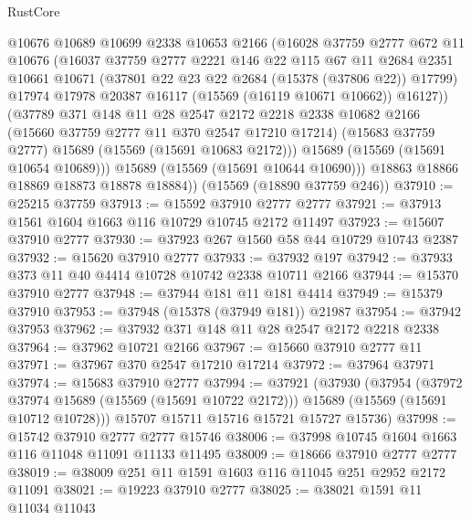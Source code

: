 \begin{lexlean}{RustCore}
\begin{coremodule}
            @10676
            @10689
            @10699
            @2338
            @10653
            @2166
            (@16028
              @37759
              @2777
              @672
              @11
              @10676
              (@16037
                @37759
                @2777
                @2221
                @146
                @22
                @115
                @67
                @11
                @2684
                @2351
                @10661
                @10671
                (@37801 @22 @23 @22 @2684 (@15378 (@37806 @22)) @17799)
                @17974
                @17978
                @20387
                @16117
                (@15569 (@16119 @10671 @10662))
                @16127))
            (@37789
              @371
              @148
              @11
              @28
              @2547
              @2172
              @2218
              @2338
              @10682
              @2166
              (@15660 @37759 @2777 @11 @370 @2547 @17210 @17214)
              (@15683 @37759 @2777)
              @15689
              (@15569 (@15691 @10683 @2172)))
            @15689
            (@15569 (@15691 @10654 @10689)))
          @15689
          (@15569 (@15691 @10644 @10690)))
        @18863
        @18866
        @18869
        @18873
        @18878
        @18884))
    (@15569 (@18890 @37759 @246))
@37910 := @25215 @37759
@37913 := @15592 @37910 @2777 @2777
@37921 := @37913 @1561 @1604 @1663 @116 @10729 @10745 @2172 @11497
@37923 := @15607 @37910 @2777
@37930 := @37923 @267 @1560 @58 @44 @10729 @10743 @2387
@37932 := @15620 @37910 @2777
@37933 := @37932 @197
@37942 := @37933 @373 @11 @40 @4414 @10728 @10742 @2338 @10711 @2166
@37944 := @15370 @37910 @2777
@37948 := @37944 @181 @11 @181 @4414
@37949 := @15379 @37910
@37953 := @37948 (@15378 (@37949 @181)) @21987
@37954 := @37942 @37953
@37962 := @37932 @371 @148 @11 @28 @2547 @2172 @2218 @2338
@37964 := @37962 @10721 @2166
@37967 := @15660 @37910 @2777 @11
@37971 := @37967 @370 @2547 @17210 @17214
@37972 := @37964 @37971
@37974 := @15683 @37910 @2777
@37994 := @37921
    (@37930
      (@37954
        (@37972 @37974 @15689 (@15569 (@15691 @10722 @2172)))
        @15689
        (@15569 (@15691 @10712 @10728)))
      @15707
      @15711
      @15716
      @15721
      @15727
      @15736)
@37998 := @15742 @37910 @2777 @2777 @15746
@38006 := @37998 @10745 @1604 @1663 @116 @11048 @11091 @11133 @11495
@38009 := @18666 @37910 @2777 @2777
@38019 := @38009 @251 @11 @1591 @1603 @116 @11045 @251 @2952 @2172 @11091
@38021 := @19223 @37910 @2777
@38025 := @38021 @1591 @11 @11034 @11043

\end{coremodule}
\end{lexlean}
